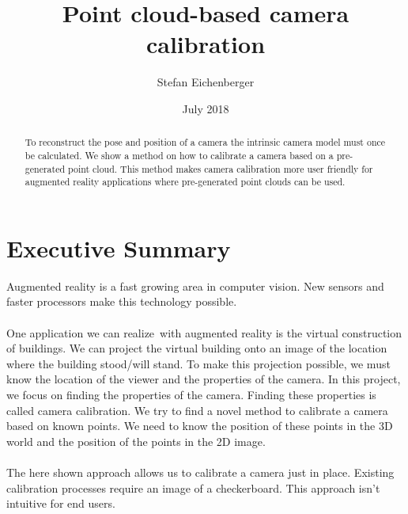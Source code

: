 \documentclass[11pt,a4paper,titlepage,oneside]{report}
\title{Point cloud-based camera calibration}
\author{Stefan Eichenberger}
\date{July 2018}
\begin{document}
\maketitle

\begin{abstract}
To reconstruct the pose and position of a camera the intrinsic camera model must once be calculated. We show a method on how to calibrate a camera based on a pre-generated point cloud. This method makes camera calibration more user friendly for augmented reality applications where pre-generated point clouds can be used.
\end{abstract}

\section*{Executive Summary}
Augmented reality is a fast growing area in computer vision. New sensors and faster processors make this technology possible.\\\\
One application we can realize with augmented reality is the virtual construction of buildings. We can project the virtual building onto an image of the location where the building stood/will stand. To make this projection possible, we must know the location of the viewer and the properties of the camera. In this project, we focus on finding the properties of the camera. Finding these properties is called camera calibration. We try to find a novel method to calibrate a camera based on known points. We need to know the position of these points in the 3D world and the position of the points in the 2D image.\\\\
The here shown approach allows us to calibrate a camera just in place. Existing calibration processes require an image of a checkerboard. This approach isn't intuitive for end users.

\tableofcontents
\end{document}
